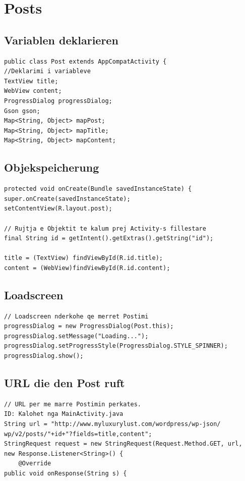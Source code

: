 \chapter{Posts}
\section{Variablen deklarieren}
\begin{verbatim}
public class Post extends AppCompatActivity {
//Deklarimi i variableve
TextView title;
WebView content;
ProgressDialog progressDialog;
Gson gson;
Map<String, Object> mapPost;
Map<String, Object> mapTitle;
Map<String, Object> mapContent;
\end{verbatim}

\section{Objekspeicherung}
\begin{verbatim} 
protected void onCreate(Bundle savedInstanceState) {
super.onCreate(savedInstanceState);
setContentView(R.layout.post);

// Rujtja e Objektit te kalum prej Activity-s fillestare
final String id = getIntent().getExtras().getString("id");

title = (TextView) findViewById(R.id.title);
content = (WebView)findViewById(R.id.content);
\end{verbatim}

\section{Loadscreen}
\begin{verbatim}
// Loadscreen nderkohe qe merret Postimi
progressDialog = new ProgressDialog(Post.this);
progressDialog.setMessage("Loading...");
progressDialog.setProgressStyle(ProgressDialog.STYLE_SPINNER);
progressDialog.show();
\end{verbatim}

\section{URL die den Post ruft}
\begin{verbatim}
// URL per me marre Postimin perkates. 
ID: Kalohet nga MainActivity.java
String url = "http://www.myluxurylust.com/wordpress/wp-json/
wp/v2/posts/"+id+"?fields=title,content";
StringRequest request = new StringRequest(Request.Method.GET, url,
new Response.Listener<String>() {
    @Override
public void onResponse(String s) {
\end{verbatim}

